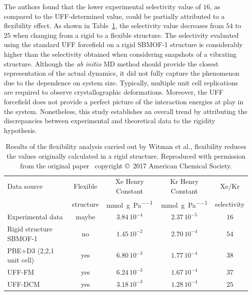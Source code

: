\documentclass[main]{subfiles}
\begin{document}
The authors found that the lower experimental selectivity value of $16$, as compared to the UFF-determined value, could be partially attributed to a flexibility effect. As shown in Table~\ref{table:witman_sbmof}, the selectivity value decreases from $54$ to $25$ when changing from a rigid to a flexible structure. The selectivity evaluated using the standard UFF forcefield on a rigid SBMOF-1 structure is considerably higher than the selectivity obtained when considering snapshots of a vibrating structure. Although the \emph{ab initio} MD method should provide the closest representation of the actual dynamics, it did not fully capture the phenomenon due to the dependence on system size. Typically, multiple unit cell replications are required to observe crystallographic deformations. Moreover, the UFF forcefield does not provide a perfect picture of the interaction energies at play in the system. Nonetheless, this study establishes an overall trend by attributing the discrepancies between experimental and theoretical data to the rigidity hypothesis.

\begin{table}[t]
  \centering
  \small
  \begin{tabular}{|l|c|c|c|c|}
  \hline
    Data source & Flexible &  Xe Henry Constant &  Kr Henry Constant &  Xe/Kr \\
      & structure &  \si{\mmol\per\g\per\Pa} &  \si{\mmol\per\g\per\Pa} &  selectivity \\
  \hline
    Experimental data\autocite{Banerjee_2016} & maybe &  $3.84\,10^{-4}$ &  $2.37\,10^{-5}$ &  $16$ \\
  \hline
    Rigid structure SBMOF-1\autocite{Banerjee_2016} & no &  $1.45\,10^{-2}$ &  $2.70\,10^{-4}$ &  $54$ \\
    PBE+D3 (2,2,1 unit cell) & yes &  $6.80\,10^{-3}$ &  $1.77\,10^{-4}$ &  $38$ \\
    UFF-FM & yes &  $6.24\,10^{-3}$ &  $1.67\,10^{-4}$ &  $37$ \\
    UFF-DCM & yes &  $3.18\,10^{-3}$ &  $1.28\,10^{-4}$ &  $25$ \\
  \hline
\end{tabular}
\caption{ Results of the flexibility analysis carried out by Witman et al., flexibility reduces the values originally calculated in a rigid structure. Reproduced with permission from the original paper~\cite{Witman_2017} copyright \copyright\ 2017 American Chemical Society.}\label{table:witman_sbmof}
\end{table}
\end{document}
